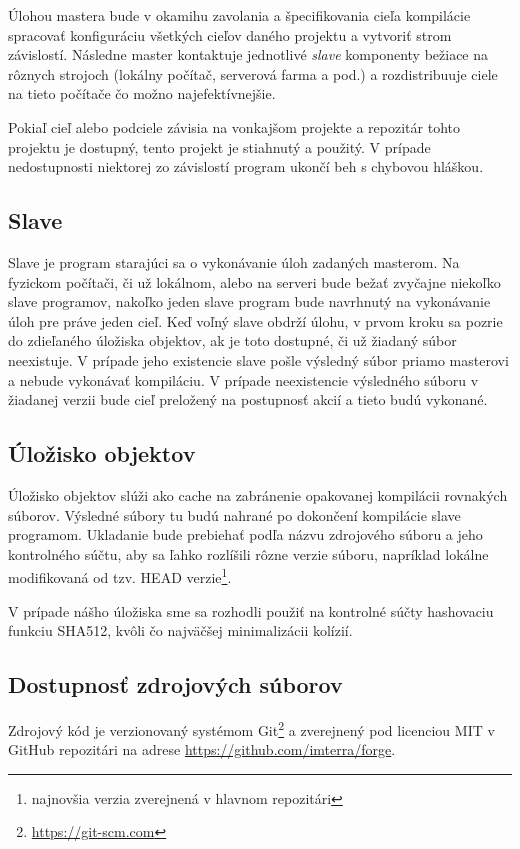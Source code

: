 Úlohou mastera bude v okamihu zavolania a špecifikovania cieľa kompilácie spracovať
konfiguráciu všetkých cieľov daného projektu a vytvoriť strom závislostí. Následne master
kontaktuje jednotlivé {\it slave} \/komponenty bežiace na rôznych strojoch (lokálny
počítač, serverová farma a pod.) a rozdistribuuje ciele na tieto počítače čo možno
najefektívnejšie.

Pokiaľ cieľ alebo podciele závisia na vonkajšom projekte a repozitár tohto projektu
je dostupný, tento projekt je stiahnutý a použitý. V prípade nedostupnosti niektorej
zo závislostí program ukončí beh s chybovou hláškou.

\subsection{Slave}
\label{sub:solution:slave}
Slave je program starajúci sa o vykonávanie úloh zadaných masterom. Na fyzickom počítači,
či už lokálnom, alebo na serveri bude bežať zvyčajne niekoľko slave programov, nakoľko
jeden slave program bude navrhnutý na vykonávanie úloh pre práve jeden cieľ. Keď voľný
slave obdrží úlohu, v prvom kroku sa pozrie do zdieľaného úložiska objektov, ak je
toto dostupné, či už žiadaný súbor neexistuje. V prípade jeho existencie slave
pošle výsledný súbor priamo masterovi a nebude vykonávať kompiláciu. V prípade
neexistencie výsledného súboru v žiadanej verzii bude cieľ preložený na postupnosť
akcií a tieto budú vykonané.

\subsection{\'{U}lo\v{z}isko objektov}
\label{sub:solution:storage}
Úložisko objektov slúži ako cache na zabránenie opakovanej kompilácii rovnakých
súborov. Výsledné súbory tu budú nahrané po dokončení kompilácie slave programom.
Ukladanie bude prebiehať podľa názvu zdrojového súboru a jeho kontrolného súčtu,
aby sa ľahko rozlíšili rôzne verzie súboru, napríklad lokálne modifikovaná od
tzv. HEAD verzie\footnote{najnovšia verzia zverejnená v hlavnom repozitári}.

V prípade nášho úložiska sme sa rozhodli použiť na kontrolné súčty hashovaciu funkciu
SHA512, kvôli čo najväčšej minimalizácii kolízií.

\subsection{Dostupnosť zdrojových súborov}
\label{sub:solution:source}
Zdrojový kód je verzionovaný systémom Git\footnote{\url{https://git-scm.com}} a
zverejnený pod licenciou MIT v GitHub repozitári na adrese \url{https://github.com/imterra/forge}.
